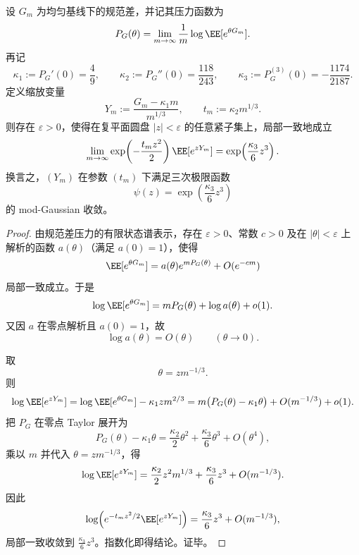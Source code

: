 \begin{theorem}\label{thm:conclusion-realinput40-gauge-difference-modgaussian-cubic}
设 \(G_m\) 为均匀基线下的规范差，并记其压力函数为
\[
P_G(\theta)=\lim_{m\to\infty}\frac1m\log \EE[e^{\theta G_m}].
\]
再记
\[
\kappa_1:=P_G'(0)=\frac49,
\qquad
\kappa_2:=P_G''(0)=\frac{118}{243},
\qquad
\kappa_3:=P_G^{(3)}(0)=-\frac{1174}{2187}.
\]
定义缩放变量
\[
Y_m:=\frac{G_m-\kappa_1 m}{m^{1/3}},
\qquad
t_m:=\kappa_2 m^{1/3}.
\]
则存在 \(\varepsilon>0\)，使得在复平面圆盘 \(|z|<\varepsilon\) 的任意紧子集上，局部一致地成立
\[
\lim_{m\to\infty}
\exp\!\left(-\frac{t_mz^2}{2}\right)\EE[e^{zY_m}]
=
\exp\!\left(\frac{\kappa_3}{6}z^3\right).
\]
换言之，\((Y_m)\) 在参数 \((t_m)\) 下满足三次极限函数
\[
\psi(z)=\exp\!\left(\frac{\kappa_3}{6}z^3\right)
\]
的 mod-Gaussian 收敛。
\end{theorem}
\begin{proof}
由规范差压力的有限状态谱表示，存在 \(\varepsilon>0\)、常数 \(c>0\) 及在 \(|\theta|<\varepsilon\) 上解析的函数 \(a(\theta)\)（满足 \(a(0)=1\)），使得
\[
\EE[e^{\theta G_m}]
=
a(\theta)e^{mP_G(\theta)}+O(e^{-cm})
\]
局部一致成立。于是
\[
\log \EE[e^{\theta G_m}]
=
mP_G(\theta)+\log a(\theta)+o(1).
\]
又因 \(a\) 在零点解析且 \(a(0)=1\)，故
\[
\log a(\theta)=O(\theta)
\qquad (\theta\to 0).
\]

取
\[
\theta=zm^{-1/3}.
\]
则
\[
\log \EE[e^{zY_m}]
=
\log \EE[e^{\theta G_m}]-\kappa_1 zm^{2/3}
=
m\bigl(P_G(\theta)-\kappa_1\theta\bigr)+O(m^{-1/3})+o(1).
\]
把 \(P_G\) 在零点 Taylor 展开为
\[
P_G(\theta)-\kappa_1\theta
=
\frac{\kappa_2}{2}\theta^2+\frac{\kappa_3}{6}\theta^3+O(\theta^4),
\]
乘以 \(m\) 并代入 \(\theta=zm^{-1/3}\)，得
\[
\log \EE[e^{zY_m}]
=
\frac{\kappa_2}{2}z^2m^{1/3}+\frac{\kappa_3}{6}z^3+O(m^{-1/3}).
\]
因此
\[
\log\!\left(
e^{-t_mz^2/2}\EE[e^{zY_m}]
\right)
=
\frac{\kappa_3}{6}z^3+O(m^{-1/3}),
\]
局部一致收敛到 \(\frac{\kappa_3}{6}z^3\)。指数化即得结论。证毕。
\end{proof}

